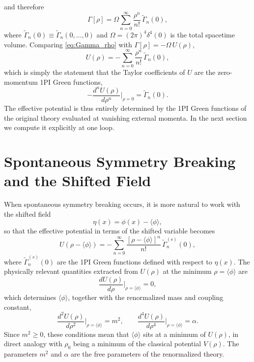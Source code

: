 and therefore
\begin{equation}
	\Gamma[\rho] = \Omega\sum_{n=0}^{\infty}
	\frac{\rho^n}{n!}\,\tilde{\Gamma}_n(0),
	\label{eq:Gamma_rho}
\end{equation}
where $\tilde{\Gamma}_n(0)\equiv\tilde{\Gamma}_n(0,\ldots,0)$ and
$\Omega = (2\pi)^4\delta^4(0)$ is the total spacetime volume. Comparing
\eqref{eq:Gamma_rho} with $\Gamma[\rho]=-\Omega\,U(\rho)$,
\begin{equation}
	U(\rho) = -\sum_{n=0}^{\infty}\frac{\rho^n}{n!}\,\tilde{\Gamma}_n(0),
\end{equation}
which is simply the statement that the Taylor coefficients of $U$ are the
zero-momentum 1PI Green functions,
\begin{equation}
	-\frac{d^n U(\rho)}{d\rho^n}\bigg|_{\rho=0} = \tilde{\Gamma}_n(0).
\end{equation}
The effective potential is thus entirely determined by the 1PI Green
functions of the original theory evaluated at vanishing external momenta.
In the next section we compute it explicitly at one loop.

\section{Spontaneous Symmetry Breaking and the Shifted Field}

When spontaneous symmetry breaking occurs, it is more natural to work
with the shifted field
\begin{equation}
	\eta(x) = \phi(x) - \langle\phi\rangle,
\end{equation}
so that the effective potential in terms of the shifted variable becomes
\begin{equation}
	U\!\left(\rho - \langle\phi\rangle\right) = -\sum_{n=0}^{\infty}
	\frac{\left[\rho - \langle\phi\rangle\right]^n}{n!}\,
	\widetilde{\Gamma}_n^{(s)}(0),
\end{equation}
where $\widetilde{\Gamma}_n^{(s)}(0)$ are the 1PI Green functions defined
with respect to $\eta(x)$. The physically relevant quantities extracted
from $U(\rho)$ at the minimum $\rho = \langle\phi\rangle$ are
\begin{equation}
	\frac{dU(\rho)}{d\rho}\bigg|_{\rho=\langle\phi\rangle} = 0,
\end{equation}
which determines $\langle\phi\rangle$, together with the renormalized mass
and coupling constant,
\begin{equation}
	\frac{d^2 U(\rho)}{d\rho^2}\bigg|_{\rho=\langle\phi\rangle} = m^2,
	\qquad
	\frac{d^4 U(\rho)}{d\rho^4}\bigg|_{\rho=\langle\phi\rangle} = \alpha.
\end{equation}
Since $m^2 \geq 0$, these conditions mean that $\langle\phi\rangle$ sits
at a minimum of $U(\rho)$, in direct analogy with $\rho_0$ being a minimum
of the classical potential $V(\rho)$. The parameters $m^2$ and $\alpha$
are the free parameters of the renormalized theory.

